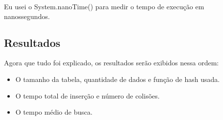 \documentclass{article}
\begin{document}
Eu usei o System.nanoTime() para medir o tempo de execução em nanossegundos.

\subsection{Resultados}
Agora que tudo foi explicado, os resultados serão exibidos nessa ordem:
\begin{itemize}
    \item O tamanho da tabela, quantidade de dados e função de hash usada.
    \item O tempo total de inserção e número de colisões.
    \item O tempo médio de busca.
\end{itemize}
\end{document}
